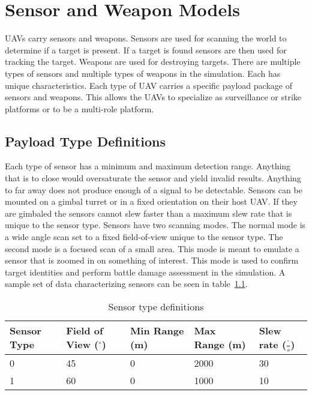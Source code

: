 \chapter{Sensor and Weapon Models}
UAVs carry sensors and weapons.  Sensors are used for scanning the world to determine if a target is present.  If a target is found sensors are then used for tracking the target.  Weapons are used for destroying targets.  There are multiple types of sensors and multiple types of weapons in the simulation.  Each has unique characteristics.  Each type of UAV carries a specific payload package of sensors and weapons.  This allows the UAVs to specialize as surveillance or strike platforms or to be a multi-role platform.


\section{Payload Type Definitions}

Each type of sensor has a minimum and maximum detection range.  Anything that is to close would oversaturate the sensor and yield invalid results.  Anything to far away does not produce enough of a signal to be detectable.  Sensors can be mounted on a gimbal turret or in a fixed orientation on their host UAV.  If they are gimbaled the sensors cannot slew faster than a maximum slew rate that is unique to the sensor type.  Sensors have two scanning modes.  The normal mode is a wide angle scan set to a fixed field-of-view unique to the sensor type.  The second mode is a focused scan of a small area.  This mode is meant to emulate a sensor that is zoomed in on something of interest.  This mode is used to confirm target identities and perform battle damage assessment in the simulation.  A sample set of data characterizing sensors can be seen in table~\ref{tab:sensorType}.

\begin{table}[h]
	\caption{Sensor type definitions}
	\centering
	\label{tab:sensorType}
	\begin{tabular}{|p{1cm}|p{1.5cm}|p{1cm}|p{1cm}|p{1.5cm}|}
		\hline
		Sensor Type & Field of View ($^{\circ}$) & Min Range (m) & Max Range (m) & Slew rate ($\frac{^{\circ}}{s}$)\\ \hline
		0 & 45 & 0 & 2000 & 30 \\
		1 & 60 & 0 & 1000 & 10 \\
		\hline
	\end{tabular}
\end{table}

